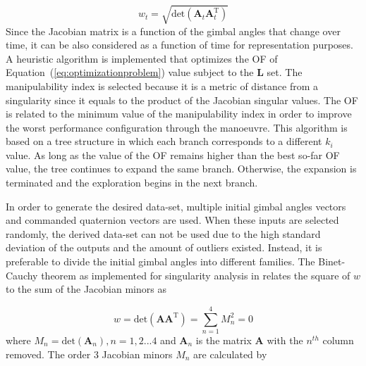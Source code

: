 \documentclass[aerospace,article,submit,moreauthors,dvi2pdf]{Definitions/mdpi}
\begin{document}
\begin{equation}
w_t=\sqrt{\text{det}(\boldsymbol{A}_t \boldsymbol{A}_t^{\mathrm{T}})}
\label{eq:manipul}
\end{equation}
Since the Jacobian matrix is a function of the gimbal angles that change over time, it can be also considered as a function of time for representation purposes.
A heuristic algorithm is implemented that optimizes the OF of Equation~(\ref{eq:optimizationproblem}) value subject to the $\textbf{L}$ set. The manipulability index is selected because it is a metric of distance from a singularity since it equals to the product of the Jacobian singular values. The OF is related to the minimum value of the manipulability index in order to improve the worst performance configuration through the manoeuvre. This algorithm is based on a tree structure in which each branch corresponds to a different $k_i$ value. As long as the value of the OF remains higher than the best so-far OF value, the tree continues to expand the same branch. Otherwise, the expansion is terminated and the exploration begins in the next branch.  



In order to generate the desired data-set, multiple initial gimbal angles vectors and commanded quaternion vectors are used. When these inputs are selected randomly, the derived data-set can not be used due to the high standard deviation of the outputs and the amount of outliers existed. Instead, it is preferable to divide the initial gimbal angles into different families. The Binet-Cauchy theorem as implemented for singularity analysis in \cite{bongwie2004} relates the square of $w$ to the sum of the Jacobian minors as

\begin{equation}
w=\mathrm{det}(\boldsymbol{A} \boldsymbol{A}^{\mathrm{T}})=\sum_{n=1}^{4} M_{n}^{2}=0
\end{equation}
where $M_n=\mathrm{det}(\textbf{A}_n), n=1,2...4$ and $\textbf{A}_n$ is the matrix $\textbf{A}$ with the $n^{th}$ column removed. 
The order 3 Jacobian minors $M_n$ are calculated by
\end{document}
